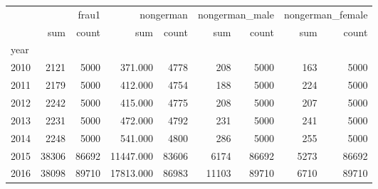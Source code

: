 \begin{tabular}{lrrrrrrrr}
\toprule
 & \multicolumn{2}{r}{frau1} & \multicolumn{2}{r}{nongerman} & \multicolumn{2}{r}{nongerman_male} & \multicolumn{2}{r}{nongerman_female} \\
 & sum & count & sum & count & sum & count & sum & count \\
year &  &  &  &  &  &  &  &  \\
\midrule
2010 & 2121 & 5000 & 371.000 & 4778 & 208 & 5000 & 163 & 5000 \\
2011 & 2179 & 5000 & 412.000 & 4754 & 188 & 5000 & 224 & 5000 \\
2012 & 2242 & 5000 & 415.000 & 4775 & 208 & 5000 & 207 & 5000 \\
2013 & 2231 & 5000 & 472.000 & 4792 & 231 & 5000 & 241 & 5000 \\
2014 & 2248 & 5000 & 541.000 & 4800 & 286 & 5000 & 255 & 5000 \\
2015 & 38306 & 86692 & 11447.000 & 83606 & 6174 & 86692 & 5273 & 86692 \\
2016 & 38098 & 89710 & 17813.000 & 86983 & 11103 & 89710 & 6710 & 89710 \\
\bottomrule
\end{tabular}
